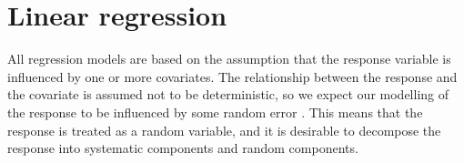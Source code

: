 \section{Linear regression}
\label{sec:linreg}
All regression models are based on the assumption that the response variable is influenced by one or more covariates.
The relationship between the response and the covariate is assumed not to be deterministic, so we expect our modelling of the response to be influenced by some random error \citep{GLMM_book}.
This means that the response is treated as a random variable, and it is desirable to decompose the response into systematic components and random components.
